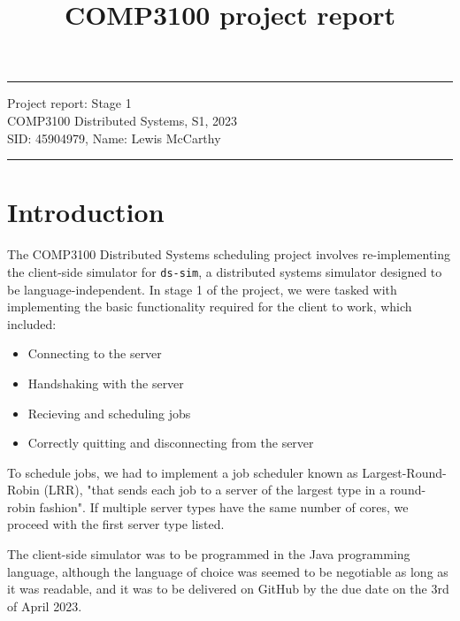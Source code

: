 \documentclass[a4paper]{article} %
\begin{document}

\title{COMP3100 project report} %
\fancyhead[C]{}
\hrule \medskip %
\begin{minipage}{1\textwidth} %
\centering 
\large %
Project report: Stage 1\\ %
COMP3100 Distributed Systems, S1, 2023\\
\normalsize %
SID: 45904979, Name: Lewis McCarthy
\end{minipage}
\medskip\hrule %
\bigskip

\section{Introduction}
The COMP3100 Distributed Systems scheduling project involves re-implementing the client-side simulator for \texttt{ds-sim}\cite{ds-sim}, a distributed systems simulator designed to be language-independent. In stage 1 of the project, we were tasked with implementing the basic functionality required for the client to work, which included:
\begin{itemize}
	\item Connecting to the server
	\item Handshaking with the server
	\item Recieving and scheduling jobs
	\item Correctly quitting and disconnecting from the server 
 \end{itemize}

To schedule jobs, we had to implement a job scheduler known as Largest-Round-Robin (LRR), "that sends each job to a server of
the largest type in a round-robin fashion"\cite{assignment-stage-1-spec}. If multiple server types have the same number of cores, we proceed with the first server type listed.

The client-side simulator was to be programmed in the Java programming language, although the language of choice was seemed to be negotiable as long as it was readable, and it was to be delivered on GitHub\cite{assignment-git} by the due date on the 3rd of April 2023.
\end{document}
